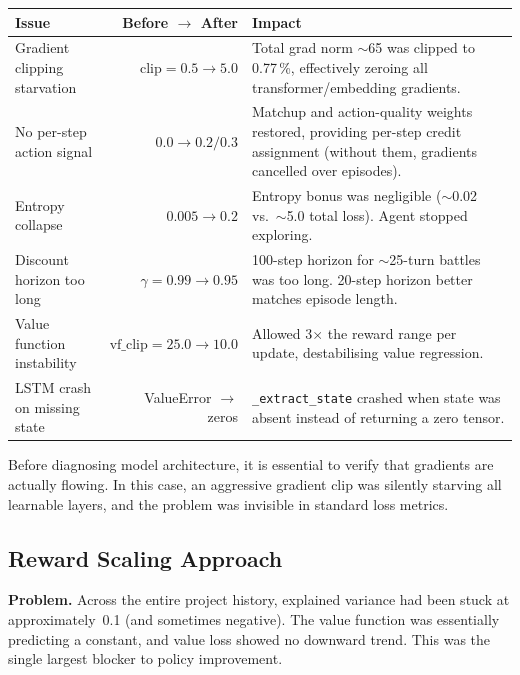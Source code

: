 \begin{center}
\small
\begin{tabularx}{\textwidth}{l r X}
  \toprule
  \textbf{Issue} & \textbf{Before $\to$ After} & \textbf{Impact} \\
  \midrule
  Gradient clipping starvation &
    $\text{clip}=0.5 \to 5.0$ &
    Total grad norm $\sim$65 was clipped to 0.77\,\%, effectively zeroing
    all transformer/embedding gradients. \\
  No per-step action signal &
    $0.0 \to 0.2/0.3$ &
    Matchup and action-quality weights restored, providing per-step credit
    assignment (without them, gradients cancelled over episodes). \\
  Entropy collapse &
    $0.005 \to 0.2$ &
    Entropy bonus was negligible ($\sim$0.02 vs.\ $\sim$5.0 total loss).
    Agent stopped exploring. \\
  Discount horizon too long &
    $\gamma=0.99 \to 0.95$ &
    100-step horizon for $\sim$25-turn battles was too long.  20-step
    horizon better matches episode length. \\
  Value function instability &
    $\text{vf\_clip}=25.0 \to 10.0$ &
    Allowed 3$\times$ the reward range per update, destabilising value
    regression. \\
  LSTM crash on missing state &
    ValueError $\to$ zeros &
    \texttt{\_extract\_state} crashed when state was absent instead of
    returning a zero tensor. \\
  \bottomrule
\end{tabularx}
\end{center}

\begin{keyinsight}
Before diagnosing model architecture, it is essential to verify that gradients
are actually flowing.  In this case, an aggressive gradient clip was silently
starving all learnable layers, and the problem was invisible in standard loss
metrics.
\end{keyinsight}

\subsection{Reward Scaling Approach}
\label{sec:reward_scaling}

\textbf{Problem.} Across the entire project history, explained variance had
been stuck at approximately~0.1 (and sometimes negative).  The value function
was essentially predicting a constant, and value loss showed no downward trend.
This was the single largest blocker to policy improvement.

